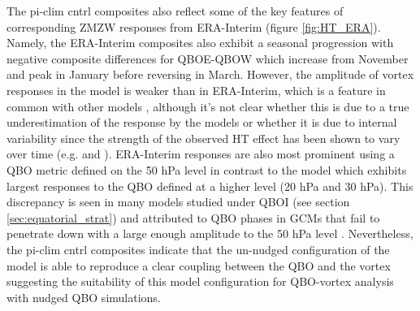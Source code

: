 The pi-clim cntrl composites also reflect some of the key features of corresponding ZMZW responses from ERA-Interim (figure \ref{fig:HT_ERA}). Namely, the ERA-Interim composites also exhibit a seasonal progression with negative composite differences for QBOE-QBOW which increase from November and peak in January before reversing in March. However, the amplitude of vortex responses in the model is weaker than in ERA-Interim, which is a feature in common with other models \citep{ansteyTeleconnections2021}, although it's not clear whether this is due to a true underestimation of the response by the models or whether it is due to internal variability since the strength of the observed HT effect has been shown to vary over time (e.g. \cite{luDecadalscale2008c} and \cite{luMechanisms2014c}). ERA-Interim responses are also most prominent using a QBO metric defined on the 50 hPa level in contrast to the model which exhibits largest responses to the QBO defined at a higher level (20 hPa and 30 hPa). This discrepancy is seen in many models studied under QBOI (see section \ref{sec:equatorial_strat}) and attributed to QBO phases in GCMs that fail to penetrate down with a large enough amplitude to the 50 hPa level \citep{ansteyTeleconnections2021}. Nevertheless, the pi-clim cntrl composites indicate that the un-nudged configuration of the model is able to reproduce a clear coupling between the QBO and the vortex suggesting the suitability of this model configuration for QBO-vortex analysis with nudged QBO simulations.

